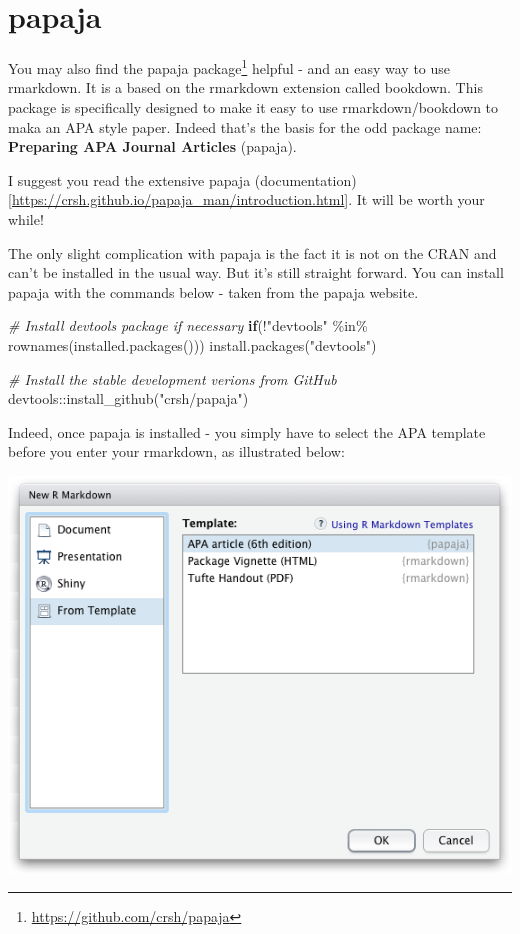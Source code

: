 \documentclass[
]{krantz}
\makeatletter
\newenvironment{Shaded}{\begin{snugshade}}{\end{snugshade}}
\newcommand{\CommentTok}[1]{\textcolor[rgb]{0.37,0.37,0.37}{\textit{#1}}}
\newcommand{\ControlFlowTok}[1]{\textcolor[rgb]{0.27,0.27,0.27}{\textbf{#1}}}
\newcommand{\FunctionTok}[1]{\textcolor[rgb]{0,0,0}{#1}}
\newcommand{\NormalTok}[1]{#1}
\newcommand{\SpecialCharTok}[1]{\textcolor[rgb]{0,0,0}{#1}}
\newcommand{\StringTok}[1]{\textcolor[rgb]{0.5,0.5,0.5}{#1}}
\renewcommand{\href}[2]{#2\footnote{\url{#1}}}
\newenvironment{kframe}{%
\medskip{}
\setlength{\fboxsep}{.8em}
 \def\at@end@of@kframe{}%
 \ifinner\ifhmode%
  \def\at@end@of@kframe{\end{minipage}}%
  \begin{minipage}{\columnwidth}%
 \fi\fi%
 \def\FrameCommand##1{\hskip\@totalleftmargin \hskip-\fboxsep
 \colorbox{shadecolor}{##1}\hskip-\fboxsep
     \hskip-\linewidth \hskip-\@totalleftmargin \hskip\columnwidth}%
 \MakeFramed {\advance\hsize-\width
   \@totalleftmargin\z@ \linewidth\hsize
   \@setminipage}}%
 {\par\unskip\endMakeFramed%
 \at@end@of@kframe}
\renewenvironment{Shaded}{\begin{kframe}}{\end{kframe}}
\makeatother
\begin{document}
\hypertarget{papaja}{%
\section{papaja}\label{papaja}}

You may also find the \href{https://github.com/crsh/papaja}{papaja package} helpful - and an easy way to use rmarkdown. It is a based on the rmarkdown extension called bookdown. This package is specifically designed to make it easy to use rmarkdown/bookdown to maka an APA style paper. Indeed that's the basis for the odd package name: \textbf{Preparing APA Journal Articles} (papaja).

I suggest you read the extensive papaja (documentation){[}\url{https://crsh.github.io/papaja_man/introduction.html}{]}. It will be worth your while!

The only slight complication with papaja is the fact it is not on the CRAN and can't be installed in the usual way. But it's still straight forward. You can install papaja with the commands below - taken from the papaja website.

\begin{Shaded}
\begin{Highlighting}[]
\CommentTok{\# Install devtools package if necessary}
\ControlFlowTok{if}\NormalTok{(}\SpecialCharTok{!}\StringTok{"devtools"} \SpecialCharTok{\%in\%} \FunctionTok{rownames}\NormalTok{(}\FunctionTok{installed.packages}\NormalTok{())) }\FunctionTok{install.packages}\NormalTok{(}\StringTok{"devtools"}\NormalTok{)}

\CommentTok{\# Install the stable development verions from GitHub}
\NormalTok{devtools}\SpecialCharTok{::}\FunctionTok{install\_github}\NormalTok{(}\StringTok{"crsh/papaja"}\NormalTok{)}
\end{Highlighting}
\end{Shaded}

Indeed, once papaja is installed - you simply have to select the APA template before you enter your rmarkdown, as illustrated below:

\includegraphics[width=0.6\linewidth]{ch_tools/images/papaja_template}
\end{document}
